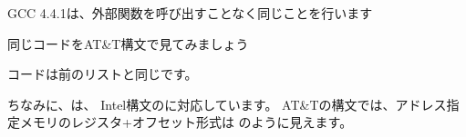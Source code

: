 
GCC 4.4.1は、外部関数を呼び出すことなく同じことを行います




同じコードをAT\&T構文で見てみましょう



\myindex{\ATTSyntax}
コードは前のリストと同じです。

ちなみに、は、
Intel構文のに対応しています。 
AT\&Tの構文では、アドレス指定メモリのレジスタ+オフセット形式は
のように見えます。
